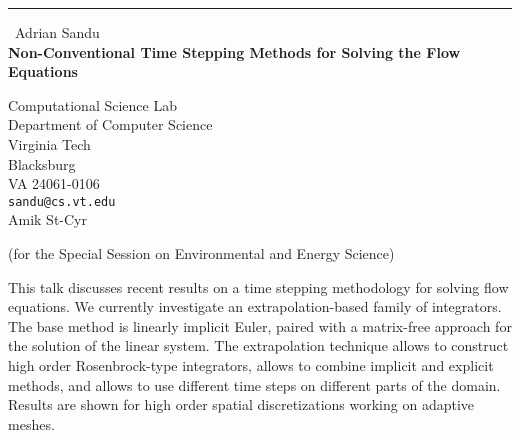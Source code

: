 \documentclass{report}
\begin{document}
\begin{center}
\rule{6in}{1pt} \
{\large Adrian Sandu \\
{\bf Non-Conventional Time Stepping Methods for Solving the Flow Equations}}

Computational Science Lab \\ Department of Computer Science \\ Virginia Tech \\ Blacksburg \\ VA 24061-0106
\\
{\tt sandu@cs.vt.edu}\\
Amik St-Cyr\end{center}

(for the Special Session on Environmental and Energy Science)


This talk discusses recent results on a time stepping methodology for
solving flow equations. We currently investigate an extrapolation-based
family of integrators. The base method is linearly implicit Euler, paired
with a matrix-free approach for the solution of the linear system. The
extrapolation technique allows to construct high order Rosenbrock-type
integrators, allows to combine implicit and explicit methods, and allows
to use different time steps on different parts of the domain. Results are
shown for high order spatial discretizations working on adaptive meshes.
\end{document}
